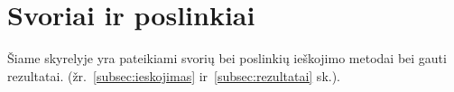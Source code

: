 \section{Svoriai ir poslinkiai}
\label{sec:svoriai_ir_poslinkiai}

Šiame skyrelyje yra pateikiami svorių bei poslinkių ieškojimo metodai bei gauti rezultatai. (žr.~\ref{subsec:ieskojimas} ir~\ref{subsec:rezultatai} sk.).


